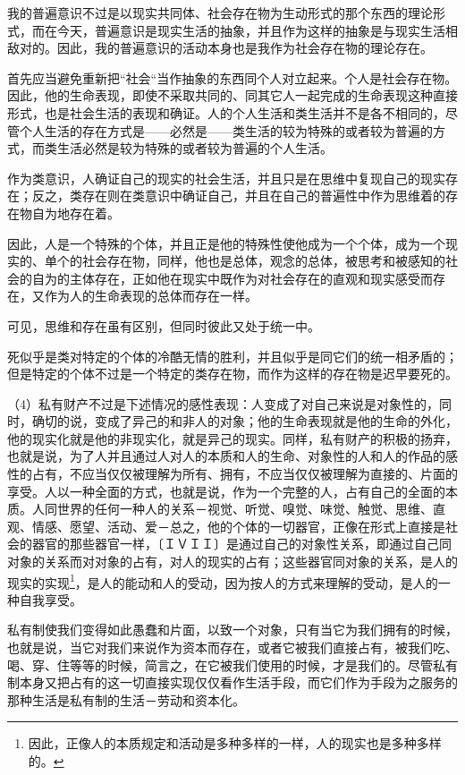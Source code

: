 \documentclass[a4paper,twoside,12pt]{ctexart}
\begin{document}
我的普遍意识不过是以现实共同体、社会存在物为生动形式的那个东西的理论形式，而在今天，普遍意识是现实生活的抽象，并且作为这样的抽象是与现实生活相敌对的。因此，我的普遍意识的活动本身也是我作为社会存在物的理论存在。

首先应当避免重新把“社会“当作抽象的东西同个人对立起来。个人是社会存在物。因此，他的生命表现，即使不采取共同的、同其它人一起完成的生命表现这种直接形式，也是社会生活的表现和确证。人的个人生活和类生活并不是各不相同的，尽管个人生活的存在方式是——必然是——类生活的较为特殊的或者较为普遍的方式，而类生活必然是较为特殊的或者较为普遍的个人生活。

作为类意识，人确证自己的现实的社会生活，并且只是在思维中复现自己的现实存在；反之，类存在则在类意识中确证自己，并且在自己的普遍性中作为思维着的存在物自为地存在着。

因此，人是一个特殊的个体，并且正是他的特殊性使他成为一个个体，成为一个现实的、单个的社会存在物，同样，他也是总体，观念的总体，被思考和被感知的社会的自为的主体存在，正如他在现实中既作为对社会存在的直观和现实感受而存在，又作为人的生命表现的总体而存在一样。

可见，思维和存在虽有区别，但同时彼此又处于统一中。

死似乎是类对特定的个体的冷酷无情的胜利，并且似乎是同它们的统一相矛盾的；但是特定的个体不过是一个特定的类存在物，而作为这样的存在物是迟早要死的。

（4）私有财产不过是下述情况的感性表现：人变成了对自己来说是对象性的，同时，确切的说，变成了异己的和非人的对象；他的生命表现就是他的生命的外化，他的现实化就是他的非现实化，就是异己的现实。同样，私有财产的积极的扬弃，也就是说，为了人并且通过人对人的本质和人的生命、对象性的人和人的作品的感性的占有，不应当仅仅被理解为所有、拥有，不应当仅仅被理解为直接的、片面的享受。人以一种全面的方式，也就是说，作为一个完整的人，占有自己的全面的本质。人同世界的任何一种人的关系－视觉、听觉、嗅觉、味觉、触觉、思维、直观、情感、愿望、活动、爱－总之，他的个体的一切器官，正像在形式上直接是社会的器官的那些器官一样，〔ＩＶＩＩ〕是通过自己的对象性关系，即通过自己同对象的关系而对对象的占有，对人的现实的占有；这些器官同对象的关系，是人的现实的实现\footnote{因此，正像人的本质规定和活动是多种多样的一样，人的现实也是多种多样的。}，是人的能动和人的受动，因为按人的方式来理解的受动，是人的一种自我享受。

私有制使我们变得如此愚蠢和片面，以致一个对象，只有当它为我们拥有的时候，也就是说，当它对我们来说作为资本而存在，或者它被我们直接占有，被我们吃、喝、穿、住等等的时候，简言之，在它被我们使用的时候，才是我们的。尽管私有制本身又把占有的这一切直接实现仅仅看作生活手段，而它们作为手段为之服务的那种生活是私有制的生活－劳动和资本化。
\end{document}
